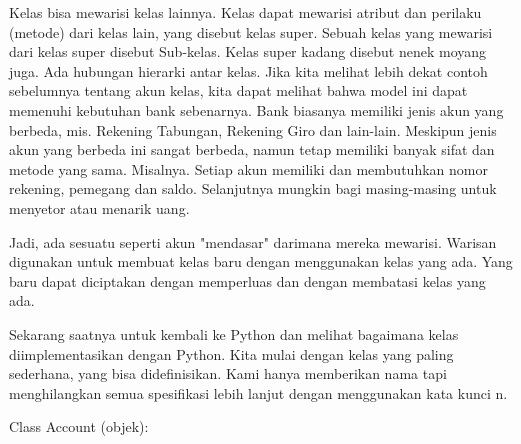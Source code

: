 {Kelas bisa mewarisi kelas lainnya. Kelas dapat mewarisi atribut dan perilaku (metode) dari kelas lain, yang disebut kelas super. Sebuah kelas yang mewarisi dari kelas super disebut Sub-kelas. Kelas super kadang disebut nenek moyang juga. Ada hubungan hierarki antar kelas. Jika kita melihat lebih dekat contoh sebelumnya tentang akun kelas, kita dapat melihat bahwa model ini dapat memenuhi kebutuhan bank sebenarnya. Bank biasanya memiliki jenis akun yang berbeda, mis. Rekening Tabungan, Rekening Giro dan lain-lain. Meskipun jenis akun yang berbeda ini sangat berbeda, namun tetap memiliki banyak sifat dan metode yang sama. Misalnya. Setiap akun memiliki dan membutuhkan nomor rekening, pemegang dan saldo. Selanjutnya mungkin bagi masing-masing untuk menyetor atau menarik uang. \par
Jadi, ada sesuatu seperti akun "mendasar" darimana mereka mewarisi. Warisan digunakan untuk membuat kelas baru dengan menggunakan kelas yang ada. Yang baru dapat diciptakan dengan memperluas dan dengan membatasi kelas yang ada. \par
Sekarang saatnya untuk kembali ke Python dan melihat bagaimana kelas diimplementasikan dengan Python. Kita mulai dengan kelas yang paling sederhana, yang bisa didefinisikan. Kami hanya memberikan nama tapi menghilangkan semua spesifikasi lebih lanjut dengan menggunakan kata kunci n. \par
\vspace{12pt}
\noindent 
Class Account (objek): \par
\vspace{12pt}
\noindent 

}
